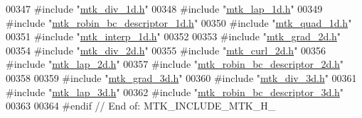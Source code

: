 \begin{DoxyCode}
00347 \textcolor{preprocessor}{#include "\hyperlink{mtk__div__1d_8h}{mtk\_div\_1d.h}"}
00348 \textcolor{preprocessor}{#include "\hyperlink{mtk__lap__1d_8h}{mtk\_lap\_1d.h}"}
00349 \textcolor{preprocessor}{#include "\hyperlink{mtk__robin__bc__descriptor__1d_8h}{mtk\_robin\_bc\_descriptor\_1d.h}"}
00350 \textcolor{preprocessor}{#include "\hyperlink{mtk__quad__1d_8h}{mtk\_quad\_1d.h}"}
00351 \textcolor{preprocessor}{#include "\hyperlink{mtk__interp__1d_8h}{mtk\_interp\_1d.h}"}
00352 
00353 \textcolor{preprocessor}{#include "\hyperlink{mtk__grad__2d_8h}{mtk\_grad\_2d.h}"}
00354 \textcolor{preprocessor}{#include "\hyperlink{mtk__div__2d_8h}{mtk\_div\_2d.h}"}
00355 \textcolor{preprocessor}{#include "\hyperlink{mtk__curl__2d_8h}{mtk\_curl\_2d.h}"}
00356 \textcolor{preprocessor}{#include "\hyperlink{mtk__lap__2d_8h}{mtk\_lap\_2d.h}"}
00357 \textcolor{preprocessor}{#include "\hyperlink{mtk__robin__bc__descriptor__2d_8h}{mtk\_robin\_bc\_descriptor\_2d.h}"}
00358 
00359 \textcolor{preprocessor}{#include "\hyperlink{mtk__grad__3d_8h}{mtk\_grad\_3d.h}"}
00360 \textcolor{preprocessor}{#include "\hyperlink{mtk__div__3d_8h}{mtk\_div\_3d.h}"}
00361 \textcolor{preprocessor}{#include "\hyperlink{mtk__lap__3d_8h}{mtk\_lap\_3d.h}"}
00362 \textcolor{preprocessor}{#include "\hyperlink{mtk__robin__bc__descriptor__3d_8h}{mtk\_robin\_bc\_descriptor\_3d.h}"}
00363 
00364 \textcolor{preprocessor}{#endif // End of: MTK\_INCLUDE\_MTK\_H\_}
\end{DoxyCode}
